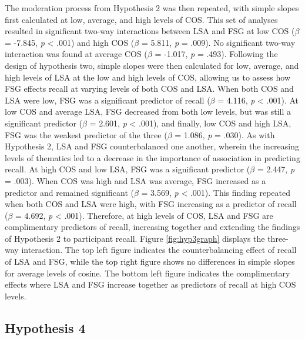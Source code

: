 \documentclass[english,man]{apa6}
\theoremstyle{definition}
\theoremstyle{definition}
\theoremstyle{definition}
\theoremstyle{remark}
\begin{document}
The moderation process from Hypothesis 2 was then repeated, with simple
slopes first calculated at low, average, and high levels of COS. This
set of analyses resulted in significant two-way interactions between LSA
and FSG at low COS (\(\beta\) = -7.845, \emph{p} \textless{} .001) and
high COS (\(\beta\) = 5.811, \emph{p} = .009). No significant two-way
interaction was found at average COS (\(\beta\) = -1.017, \emph{p} =
.493). Following the design of hypothesis two, simple slopes were then
calculated for low, average, and high levels of LSA at the low and high
levels of COS, allowing us to assess how FSG effects recall at varying
levels of both COS and LSA. When both COS and LSA were low, FSG was a
significant predictor of recall (\(\beta\) = 4.116, \emph{p} \textless{}
.001). At low COS and average LSA, FSG decreased from both low levels,
but was still a significant predictor (\(\beta\) = 2.601, \emph{p}
\textless{} .001), and finally, low COS and high LSA, FSG was the
weakest predictor of the three (\(\beta\) = 1.086, \emph{p} = .030). As
with Hypothesis 2, LSA and FSG counterbalanced one another, wherein the
increasing levels of thematics led to a decrease in the importance of
association in predicting recall. At high COS and low LSA, FSG was a
significant predictor (\(\beta\) = 2.447, \emph{p} = .003). When COS was
high and LSA was average, FSG increased as a predictor and remained
significant (\(\beta\) = 3.569, \emph{p} \textless{} .001). This finding
repeated when both COS and LSA were high, with FSG increasing as a
predictor of recall (\(\beta\) = 4.692, \emph{p} \textless{} .001).
Therefore, at high levels of COS, LSA and FSG are complimentary
predictors of recall, increasing together and extending the findings of
Hypothesis 2 to participant recall. Figure \ref{fig:hyp3graph} displays
the three-way interaction. The top left figure indicates the
counterbalancing effect of recall of LSA and FSG, while the top right
figure shows no differences in simple slopes for average levels of
cosine. The bottom left figure indicates the complimentary effects where
LSA and FSG increase together as predictors of recall at high COS
levels.

\subsection{Hypothesis 4}\label{hypothesis-4}
\end{document}
